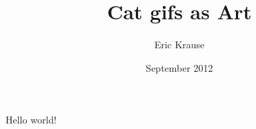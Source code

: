 \documentclass{article}
\title{Cat gifs as Art}
\author{Eric Krause}
\date{September 2012}
\begin{document}
\maketitle 

Hello world!
\end{document}
